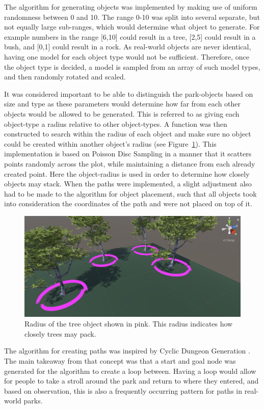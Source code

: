 The algorithm for generating objects was implemented by making use of uniform randomness between 0 and 10.
The range 0-10 was split into several separate, but not equally large sub-ranges, which would determine what object to generate.
For example numbers in the range [6,10] could result in a tree, [2,5] could result in a bush, and [0,1] could result in a rock.
As real-world objects are never identical, having one model for each object type would not be sufficient. 
Therefore, once the object type is decided, a model is sampled from an array of such model types, and then randomly rotated and scaled. 

It was considered important to be able to distinguish the park-objects based on size and type as these parameters would determine how far from each other objects would be allowed to be generated.
This is referred to as giving each object-type a radius relative to other object-types.
A function was then constructed to search within the radius of each object and make sure no object could be created within another object's radius (see Figure~\ref{fig:radius}).
This implementation is based on Poisson Disc Sampling \cite{poisson_fast} in a manner that it scatters points randomly across the plot, while maintaining a distance from each already created point.
Here the object-radius is used in order to determine how closely objects may stack. 
When the paths were implemented, a slight adjustment also had to be made to the algorithm for object placement, such that all objects took into consideration the coordinates of the path and were not placed on top of it.
\begin{figure}[H]
  \centering
  \includegraphics[width=\linewidth]{figure/radiuscontrol.png}
  \caption{Radius of the tree object shown in pink. This radius indicates how closely trees may pack.}
  \label{fig:radius}
\end{figure}

The algorithm for creating paths was inspired by Cyclic Dungeon Generation \cite{cyclic}.
The main takeaway from that concept was that a start and goal node was generated for the algorithm to create a loop between.
Having a loop would allow for people to take a stroll around the park and return to where they entered, and based on observation, this is also a frequently occurring pattern for paths in real-world parks. 

